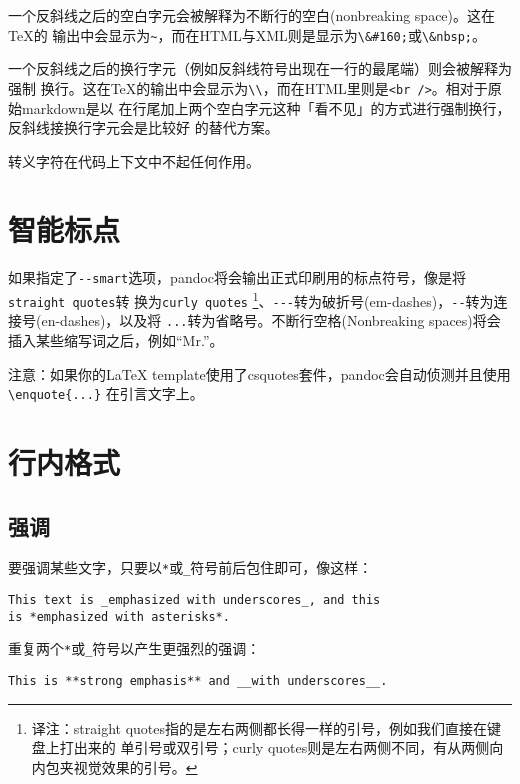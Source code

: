 \documentclass[fancyhdr,bookmark]{ctexbook}
\begin{document}
一个反斜线之后的空白字元会被解释为不断行的空白(nonbreaking
space)。这在TeX的
输出中会显示为\lstinline!~!，而在HTML与XML则是显示为\lstinline!\&#160;!或\lstinline!\&nbsp;!。

一个反斜线之后的换行字元（例如反斜线符号出现在一行的最尾端）则会被解释为强制
换行。这在TeX的输出中会显示为\lstinline!\\!，而在HTML里则是\lstinline!<br />!。相对于原始markdown是以
在行尾加上两个空白字元这种「看不见」的方式进行强制换行，反斜线接换行字元会是比较好
的替代方案。

转义字符在代码上下文中不起任何作用。

\section{智能标点}\label{ux667aux80fdux6807ux70b9}

如果指定了\lstinline!--smart!选项，pandoc将会输出正式印刷用的标点符号，像是将\lstinline!straight quotes!转
换为\lstinline!curly quotes! \footnote{译注：straight
  quotes指的是左右两侧都长得一样的引号，例如我们直接在键盘上打出来的
  单引号或双引号；curly
  quotes则是左右两侧不同，有从两侧向内包夹视觉效果的引号。}、\lstinline!---!转为破折号(em-dashes)，\lstinline!--!转为连接号(en-dashes)，以及将
\lstinline!...!转为省略号。不断行空格(Nonbreaking
spaces)将会插入某些缩写词之后，例如``Mr.''。

注意：如果你的LaTeX
template使用了csquotes套件，pandoc会自动侦测并且使用\lstinline!\enquote{...}!
在引言文字上。

\section{行内格式}\label{ux884cux5185ux683cux5f0f}

\subsection{强调}\label{ux5f3aux8c03}

要强调某些文字，只要以\lstinline!*!或\lstinline!_!符号前后包住即可，像这样：

\begin{lstlisting}
This text is _emphasized with underscores_, and this
is *emphasized with asterisks*.
\end{lstlisting}

重复两个\lstinline!*!或\lstinline!_!符号以产生更强烈的强调：

\begin{lstlisting}
This is **strong emphasis** and __with underscores__.
\end{lstlisting}
\end{document}

